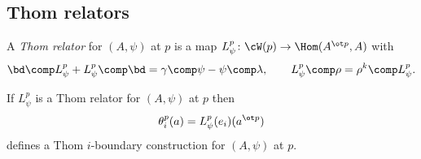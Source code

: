 \subsection{Thom relators}

\begin{definition}
	A \textit{Thom relator} for $(A, \psi)$ at $p$ is a map $L_\psi^p \colon \cW(p) \to \Hom(A^{\ot p}, A)$ with
	\[
	\bd \comp L_\psi^p + L_\psi^p \comp \bd = \gamma \comp \psi - \psi \comp \lambda, \qquad
	L_\psi^p \comp \rho = \rho^k \comp L_\psi^p.
	\]
\end{definition}


\begin{theorem}
	If $L_\psi^p$ is a Thom relator for $(A, \psi)$ at $p$ then
	\[
	\theta_i^p(a) = L_\psi^p(e_i)(a^{\ot p})
	\]
	defines a Thom $i$-boundary construction for $(A, \psi)$ at $p$.
\end{theorem}

